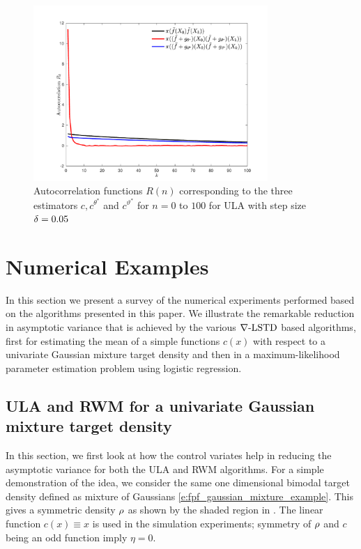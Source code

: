 \begin{figure}[htbp]
	\centering
	\includegraphics[width=3.5in]{images/Chap5_cov_R_n_gamma_pt05}
	\caption{ Autocorrelation functions $R(n)$ corresponding to the three estimators $c, c^{\theta^*}$ and $c^{\vartheta^*}$  for $n= 0$ to $100$ for ULA with step size $\delta = 0.05$}
	\label{fig:mcmc_auto_correlation}
\end{figure}

\section{Numerical Examples}
\label{s:mcmc_numerics}
In this section we present a survey of the numerical experiments performed based on the algorithms presented in this paper. We illustrate the remarkable reduction in asymptotic variance that is achieved by the various $\nabla\text{-LSTD}$ based algorithms, first for estimating the mean of a simple functions $c(x)$ with respect to a univariate Gaussian mixture target density and then in a maximum-likelihood parameter estimation problem using logistic regression.   

\subsection{ULA and RWM for a univariate Gaussian mixture target density}
\label{s:mcmc_ex_avar}
In this section, we first look at how the control variates help in reducing the asymptotic variance for both the ULA and RWM algorithms.  For a simple demonstration of the idea, we consider the same one dimensional bimodal target density defined as mixture of Gaussians \eqref{e:fpf_gaussian_mixture_example}. This gives a symmetric density $\rho$ as shown by the shaded region in . The linear function $c(x) \equiv x$ is used in the simulation experiments; symmetry of $\rho$ and $c$ being an odd function imply $\eta = 0$.


